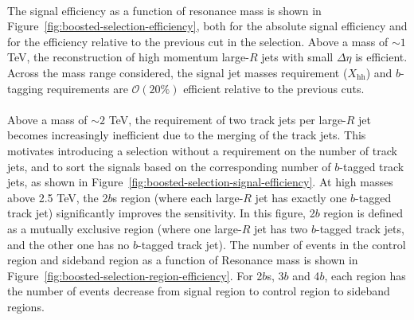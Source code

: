 \paragraph{}
The signal efficiency as a function of resonance mass is shown in Figure~\ref{fig:boosted-selection-efficiency}, both for the absolute signal efficiency and for the efficiency relative to the previous cut in the selection. Above a mass of $\sim\!1$ TeV, the reconstruction of high momentum large-$R$ jets with small $\Delta\eta$ is efficient. Across the mass range considered, the signal jet masses requirement ($X_\text{hh}$) and $b$-tagging requirements are $\mathcal{O}(20\%)$ efficient relative to the previous cuts. 

\paragraph{}
Above a mass of $\sim\!2$ TeV, the requirement of two track jets per large-$R$ jet becomes increasingly inefficient due to the merging of the track jets. This motivates introducing a selection without a requirement on the number of track jets, and to sort the signals based on the corresponding number of $b$-tagged track jets, as shown in Figure~\ref{fig:boosted-selection-signal-efficiency}. At high masses above 2.5 TeV, the 2$b$s region (where each large-$R$ jet has exactly one $b$-tagged track jet) significantly improves the sensitivity. In this figure, 2$b$ region is defined as a mutually exclusive region (where one large-$R$ jet has two $b$-tagged track jets, and the other one has no $b$-tagged track jet). The number of events in the control region and sideband region as a function of Resonance mass is shown in Figure~\ref{fig:boosted-selection-region-efficiency}. For 2$b$s, 3$b$ and 4$b$, each region has the number of events decrease from signal region to control region to sideband regions.

